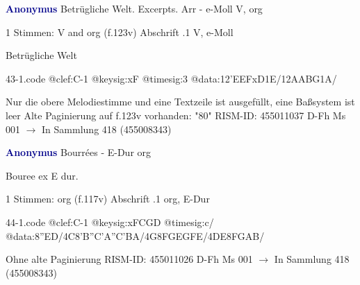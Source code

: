 \documentclass[twocolumn]{book}
\begin{document}
\newline \par \vspace{7pt} \textcolor{darkblue}{\textbf{Anonymus  }}
\newline Betrügliche Welt. Excerpts. Arr - e-Moll
\newline V, org
\newline \begin{itshape}\end{itshape} 
\newline \textcolor{darkblue}{}  1 Stimmen: V and org  (f.123v)
\newline Abschrift
.1  V, e-Moll
\newline \begin{footnotesize} Betrügliche Welt \end{footnotesize}  
\begin{filecontents*}{43-1.code}
@clef:C-1
@keysig:xF
@timesig:3
@data:12'EEFxD1E/12AABG1A/
\end{filecontents*}
\newline
%
\newline Nur die obere Melodiestimme und eine Textzeile ist ausgefüllt, eine Baßsystem ist leer
\newline Alte Paginierung auf f.123v vorhanden: "80"
\newline RISM-ID: 455011037
\newline D-Fh  Ms 001
\newline $\rightarrow$ In Sammlung 418 (455008343)
      
\newline \par \vspace{7pt} \textcolor{darkblue}{\textbf{Anonymus  }}
\newline Bourrées - E-Dur
\newline org
\newline \begin{itshape}[f.117v, heading:] Bouree ex E dur.\end{itshape} 
\newline \textcolor{darkblue}{}  1 Stimmen: org  (f.117v)
\newline Abschrift
.1  org, E-Dur  
\begin{filecontents*}{44-1.code}
@clef:C-1
@keysig:xFCGD
@timesig:c/
@data:{8''ED}/4C{8'B''C}{'A''C'BA}/4G{8FG}{EGFE}/4DE{8FGAB}/
\end{filecontents*}
\newline
%
\newline Ohne alte Paginierung
\newline RISM-ID: 455011026
\newline D-Fh  Ms 001
\newline $\rightarrow$ In Sammlung 418 (455008343)
      
\end{document}

